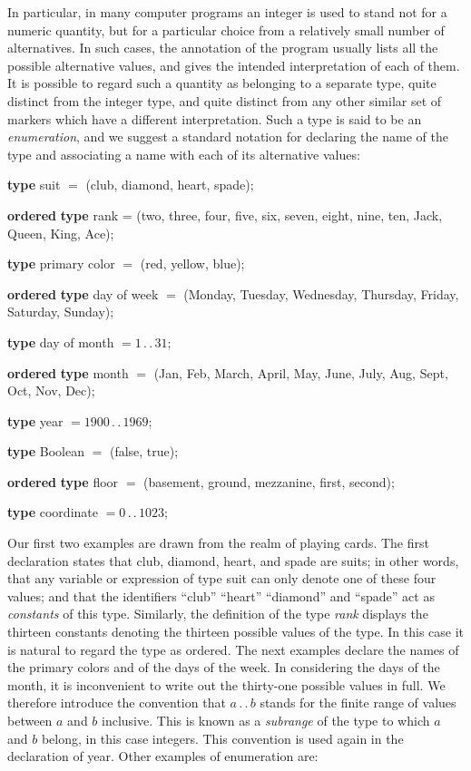 In particular, in many computer programs an integer is used to stand not for a numeric quantity, but for a particular choice from a relatively small number of alternatives. In such cases, the annotation of the program usually lists all the possible alternative values, and gives the intended interpretation of each of them. It is possible to regard such a quantity as belonging to a separate type, quite distinct from the integer type, and quite distinct from any other similar set of markers which have a different interpretation. Such a type is said to be an \textit{enumeration}, and we suggest a standard notation for declaring the name of the type and associating a name with each of its alternative values:
\medskip

\tabto{3.7em}\textbf{type} suit $=$ (club, diamond, heart, spade);

\noindent
{}\parindent\textbf{ordered} \tabto{3.7em}\textbf{type} rank = (two, three, four, five, six, seven, eight, nine, ten, Jack, Queen, King, Ace);
\medskip

\tabto{3.7em}\textbf{type} primary color $=$ (red, yellow, blue);

\noindent
{}\parindent\textbf{ordered} \tabto{3.7em}\textbf{type} day of week $=$ (Monday, Tuesday, Wednesday, Thursday, Friday, Saturday, Sunday);
\medskip

\tabto{3.7em}\textbf{type} day of month $= 1\,.\,.\,31$;

\noindent
{}\parindent\textbf{ordered} \tabto{3.7em}\textbf{type} month $=$ (Jan, Feb, March, April, May, June, July, Aug, Sept, Oct, Nov, Dec);
\medskip

\tabto{3.7em}\textbf{type} year $= 1900\,.\,.\,1969$;

\tabto{3.7em}\textbf{type} Boolean $=$ (false, true);
\medskip

\noindent
{}\parindent\textbf{ordered} \tabto{3.7em}\textbf{type} floor $=$ (basement, ground, mezzanine, first, second);

\tabto{3.7em}\textbf{type} coordinate $= 0\,.\,.\,1023$;
\medskip

Our first two examples are drawn from the realm of playing cards. The first declaration states that club, diamond, heart, and spade are suits; in other words, that any variable or expression of type suit can only denote one of these four values; and that the identifiers ``club'' ``heart'' ``diamond'' and ``spade'' act as \textit{constants} of this type. Similarly, the definition of the type \textit{rank} displays the thirteen constants denoting the thirteen possible values of the type. In this case it is natural to regard the type as ordered. The next examples declare the names of the primary colors and of the days of the week. In considering the days of the month, it is inconvenient to write out the thirty-one possible values in full. We therefore introduce the convention that $a\,.\,.\,b$ stands for the finite range of values between $a$ and $b$ inclusive. This is known as a \textit{subrange} of the type to which $a$ and $b$ belong, in this case integers. This convention is used again in the declaration of year. Other examples of enumeration are:


